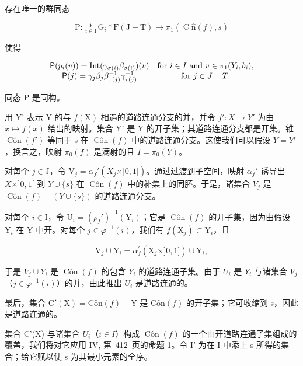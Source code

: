 存在唯一的群同态

\[
\mathrm{P} \colon \underset {i \in \mathrm{I}} {*} \mathrm{G} _ {i} * \mathrm{F} (\mathrm{J} - \mathrm{T}) \to \pi_ {1} (\operatorname{C} \hat {\mathrm{n}} (f), s)
\]

使得

\[
\begin{array}{c c} \mathsf {P} (p _ {i} (v)) = \operatorname{Int} (\gamma_ {\sigma (i)} \beta_ {\sigma (i)}) (v) & \text {for } i\in I \text { and } v\in\pi_{1} (Y_{i},b_{i}), \\ \mathsf {P} (j) = \gamma_ {j} \beta_ {j} \beta_ {\tau (j)} ^ {- 1} \gamma_ {\tau (j)} ^ {- 1} & \text {for } j\in J - T. \end{array}
\]

同态 P 是同构。

用 Y' 表示 Y 的与 \(f(\mathrm{X})\) 相遇的道路连通分支的并，并令 \(f'\colon X \to Y'\) 为由 \(x \mapsto f(x)\) 给出的映射。集合 Y' 是 Y 的开子集；其道路连通分支都是开集。锥 \(\operatorname{Côn}(f')\) 等同于 s 在 \(\operatorname{Côn}(f)\) 中的道路连通分支。这使我们可以假设 \(Y = Y'\)，换言之，映射 \(\pi_{0}(f)\) 是满射的且 \(I = \pi_{0}(Y)\)。

对每个 \(j \in \mathrm{J}\)，令 \(\mathrm{V}_j = \alpha_f'(X_j \times ]0,1[)\)。通过过渡到子空间，映射 \(\alpha_f'\) 诱导出 \(X \times ]0,1[\) 到 \(Y \cup \{s\}\) 在 \(\operatorname{Côn}(f)\) 中的补集上的同胚。于是，诸集合 \(V_j\) 是 \(\operatorname{Côn}(f) - (Y \cup \{s\})\) 的道路连通分支。

对每个 \(i \in \mathrm{I}\)，令 \(\mathrm{U}_i = (\rho_f')^{-1}(\mathrm{Y}_i)\)；它是 \(\operatorname{Côn}(f)\) 的开子集，因为由假设 \(\mathrm{Y}_i\) 在 \(\mathrm{Y}\) 中开。对每个 \(j \in \overline{\varphi}^{-1}(i)\)，我们有 \(f(\mathrm{X}_j) \subset \mathrm{Y}_i\)，且

\[
\mathrm{V} _ {j} \cup \mathrm{Y} _ {i} = \alpha_ {f} ^ {\prime} (\mathrm{X} _ {j} \times ] 0, 1 ]) \cup \mathrm{Y} _ {i},
\]

于是 \(V_{j} \cup Y_{i}\) 是 \(\operatorname{Côn}(f)\) 的包含 \(Y_{i}\) 的道路连通子集。由于 \(U_{i}\) 是 \(Y_{i}\) 与诸集合 \(V_{j}\)（\(j \in \overline{\varphi}^{-1}(i)\)）的并，由此推出 \(U_{i}\) 是道路连通的。

最后，集合 \(\mathrm{C}'(\mathrm{X}) = \mathrm{C}\hat{\mathrm{o}}\mathrm{n}(f) - \mathrm{Y}\) 是 \(\mathrm{C}\hat{\mathrm{o}}\mathrm{n}(f)\) 的开子集；它可收缩到 s，因此是道路连通的。

集合 C'(X) 与诸集合 \(U_{i}\)（\(i \in I\)）构成 \(\operatorname{Côn}(f)\) 的一个由开道路连通子集组成的覆盖，我们将对它应用 IV, 第~412~页的命题 1。令 I' 为在 I 中添上 s 所得的集合；给它赋以使 s 为其最小元素的全序。

